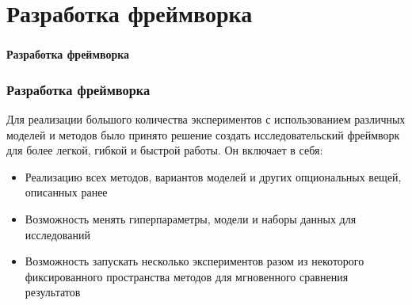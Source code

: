 \documentclass[usenames,dvipsnames, 10pt]{beamer}
\begin{document}
\section{Разработка фреймворка}
\begin{frame}
\frametitle{\phatom}
\centering
\Large \textbf{Разработка фреймворка}
\end{frame}
\begin{frame}
\frametitle{Разработка фреймворка}
Для реализации большого количества экспериментов с использованием различных моделей и методов было принято решение создать исследовательский фреймворк для более легкой, гибкой и быстрой работы.
\vskip 0.5cm
Он включает в себя:
\begin{itemize}
    \item Реализацию всех методов, вариантов моделей и других опциональных вещей, описанных ранее
    \item Возможность менять гиперпараметры, модели и наборы данных для исследований
    \item Возможность запускать несколько экспериментов разом из некоторого фиксированного пространства методов для мгновенного сравнения результатов
\end{itemize}
\end{frame}
\end{document}
